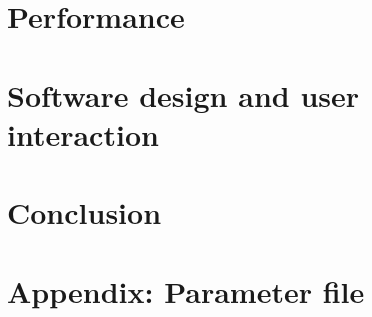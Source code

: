\documentclass[%
 aip,
superscriptaddress,
 amsmath,amssymb,
preprint,%
]{revtex4-2}
\begin{document}
\section{\label{sec:level5}Performance}



\section{\label{sec:level6}Software design and user interaction}






\section{\label{sec:level7}Conclusion}


\section{Appendix: Parameter file}




\end{document}
